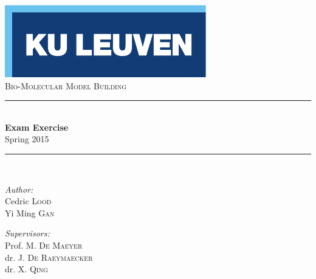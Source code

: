 \begin{titlepage}
  \begin{center}
    
    \includegraphics[scale=1.5]{Figures/kuleuven_logo.pdf}~\\[4.5cm]
    
    \textsc{\Large Bio-Molecular Model Building}\\[0.5cm]
    
    \rule{\linewidth}{0.3mm}\\[0.4cm]
    {\huge \bfseries Exam Exercise} \\[0.4cm]
    {\large Spring 2015} \\[0.4cm]
    \rule{\linewidth}{0.3mm}\\[1.5cm]
    
    \begin{minipage}{0.4\textwidth}
      \begin{flushleft} \large
        \emph{Author:}\\
        Cedric \textsc{Lood}\\
        Yi Ming \textsc{Gan}\\
      \end{flushleft}
    \end{minipage}
    \begin{minipage}{0.4\textwidth}
      \begin{flushright} \large
        \emph{Supervisors:} \\
        Prof. M. \textsc{De Maeyer}\\
        dr. J. \textsc{De Raeymaecker}\\
        dr. X. \textsc{Qing}
      \end{flushright}
    \end{minipage}
    
    \vfill
    

\end{center}
\end{titlepage}
